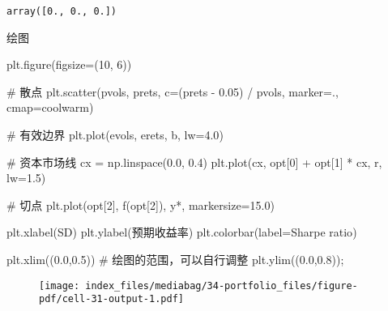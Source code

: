 \documentclass[
  letterpaper,
  DIV=11,
  numbers=noendperiod]{scrreprt}
\newenvironment{Shaded}{\begin{snugshade}}{\end{snugshade}}
\newcommand{\CommentTok}[1]{\textcolor[rgb]{0.37,0.37,0.37}{#1}}
\newcommand{\DecValTok}[1]{\textcolor[rgb]{0.68,0.00,0.00}{#1}}
\newcommand{\FloatTok}[1]{\textcolor[rgb]{0.68,0.00,0.00}{#1}}
\newcommand{\NormalTok}[1]{\textcolor[rgb]{0.00,0.23,0.31}{#1}}
\newcommand{\OperatorTok}[1]{\textcolor[rgb]{0.37,0.37,0.37}{#1}}
\newcommand{\StringTok}[1]{\textcolor[rgb]{0.13,0.47,0.30}{#1}}
\begin{document}
\begin{verbatim}
array([0., 0., 0.])
\end{verbatim}

绘图

\begin{Shaded}
\begin{Highlighting}[]
\NormalTok{plt.figure(figsize}\OperatorTok{=}\NormalTok{(}\DecValTok{10}\NormalTok{, }\DecValTok{6}\NormalTok{)) }

\CommentTok{\# 散点}
\NormalTok{plt.scatter(pvols, prets, c}\OperatorTok{=}\NormalTok{(prets }\OperatorTok{{-}} \FloatTok{0.05}\NormalTok{) }\OperatorTok{/}\NormalTok{ pvols, }
\NormalTok{            marker}\OperatorTok{=}\StringTok{\textquotesingle{}.\textquotesingle{}}\NormalTok{, cmap}\OperatorTok{=}\StringTok{\textquotesingle{}coolwarm\textquotesingle{}}\NormalTok{) }

\CommentTok{\# 有效边界}
\NormalTok{plt.plot(evols, erets, }\StringTok{\textquotesingle{}b\textquotesingle{}}\NormalTok{, lw}\OperatorTok{=}\FloatTok{4.0}\NormalTok{) }

\CommentTok{\# 资本市场线}
\NormalTok{cx }\OperatorTok{=}\NormalTok{ np.linspace(}\FloatTok{0.0}\NormalTok{, }\FloatTok{0.4}\NormalTok{) }
\NormalTok{plt.plot(cx, opt[}\DecValTok{0}\NormalTok{] }\OperatorTok{+}\NormalTok{ opt[}\DecValTok{1}\NormalTok{] }\OperatorTok{*}\NormalTok{ cx, }\StringTok{\textquotesingle{}r\textquotesingle{}}\NormalTok{, lw}\OperatorTok{=}\FloatTok{1.5}\NormalTok{) }

\CommentTok{\# 切点}
\NormalTok{plt.plot(opt[}\DecValTok{2}\NormalTok{], f(opt[}\DecValTok{2}\NormalTok{]), }\StringTok{\textquotesingle{}y*\textquotesingle{}}\NormalTok{, markersize}\OperatorTok{=}\FloatTok{15.0}\NormalTok{) }

\NormalTok{plt.xlabel(}\StringTok{\textquotesingle{}SD\textquotesingle{}}\NormalTok{) }
\NormalTok{plt.ylabel(}\StringTok{\textquotesingle{}预期收益率\textquotesingle{}}\NormalTok{) }
\NormalTok{plt.colorbar(label}\OperatorTok{=}\StringTok{\textquotesingle{}Sharpe ratio\textquotesingle{}}\NormalTok{) }

\NormalTok{plt.xlim((}\FloatTok{0.0}\NormalTok{,}\FloatTok{0.5}\NormalTok{)) }\CommentTok{\# 绘图的范围，可以自行调整}
\NormalTok{plt.ylim((}\FloatTok{0.0}\NormalTok{,}\FloatTok{0.8}\NormalTok{))}\OperatorTok{;}
\end{Highlighting}
\end{Shaded}

\begin{figure}[H]

{\centering \texttt{[image: index\_files/mediabag/34-portfolio\_files/figure-pdf/cell-31-output-1.pdf]}

}

\end{figure}
\end{document}
